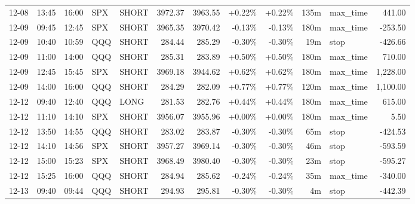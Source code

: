 \documentclass[11pt,a4paper,twoside]{article}
\begin{document}
\begin{center}
\begin{longtable}{>{\color{txtmain}}l l l l l r r r r r >{\color{txtmain}}l r}
12-08 & 13:45 & 16:00 & SPX & SHORT & 3972.37 & 3963.55 & \textcolor{wingreen}{+0.22\%} & \textcolor{wingreen}{+0.22\%} & 135m & max\_time & \textcolor{wingreen}{441.00} \\
12-09 & 09:45 & 12:45 & SPX & SHORT & 3965.35 & 3970.42 & \textcolor{lossred}{-0.13\%} & \textcolor{lossred}{-0.13\%} & 180m & max\_time & \textcolor{lossred}{-253.50} \\
12-09 & 10:40 & 10:59 & QQQ & SHORT & 284.44 & 285.29 & \textcolor{lossred}{-0.30\%} & \textcolor{lossred}{-0.30\%} & 19m & stop & \textcolor{lossred}{-426.66} \\
12-09 & 11:00 & 14:00 & QQQ & SHORT & 285.31 & 283.89 & \textcolor{wingreen}{+0.50\%} & \textcolor{wingreen}{+0.50\%} & 180m & max\_time & \textcolor{wingreen}{710.00} \\
12-09 & 12:45 & 15:45 & SPX & SHORT & 3969.18 & 3944.62 & \textcolor{wingreen}{+0.62\%} & \textcolor{wingreen}{+0.62\%} & 180m & max\_time & \textcolor{wingreen}{1,228.00} \\
12-09 & 14:00 & 16:00 & QQQ & SHORT & 284.29 & 282.09 & \textcolor{wingreen}{+0.77\%} & \textcolor{wingreen}{+0.77\%} & 120m & max\_time & \textcolor{wingreen}{1,100.00} \\
12-12 & 09:40 & 12:40 & QQQ & LONG & 281.53 & 282.76 & \textcolor{wingreen}{+0.44\%} & \textcolor{wingreen}{+0.44\%} & 180m & max\_time & \textcolor{wingreen}{615.00} \\
12-12 & 11:10 & 14:10 & SPX & SHORT & 3956.07 & 3955.96 & \textcolor{wingreen}{+0.00\%} & \textcolor{wingreen}{+0.00\%} & 180m & max\_time & \textcolor{wingreen}{5.50} \\
12-12 & 13:50 & 14:55 & QQQ & SHORT & 283.02 & 283.87 & \textcolor{lossred}{-0.30\%} & \textcolor{lossred}{-0.30\%} & 65m & stop & \textcolor{lossred}{-424.53} \\
12-12 & 14:10 & 14:56 & SPX & SHORT & 3957.27 & 3969.14 & \textcolor{lossred}{-0.30\%} & \textcolor{lossred}{-0.30\%} & 46m & stop & \textcolor{lossred}{-593.59} \\
12-12 & 15:00 & 15:23 & SPX & SHORT & 3968.49 & 3980.40 & \textcolor{lossred}{-0.30\%} & \textcolor{lossred}{-0.30\%} & 23m & stop & \textcolor{lossred}{-595.27} \\
12-12 & 15:25 & 16:00 & QQQ & SHORT & 284.94 & 285.62 & \textcolor{lossred}{-0.24\%} & \textcolor{lossred}{-0.24\%} & 35m & max\_time & \textcolor{lossred}{-340.00} \\
12-13 & 09:40 & 09:44 & QQQ & SHORT & 294.93 & 295.81 & \textcolor{lossred}{-0.30\%} & \textcolor{lossred}{-0.30\%} & 4m & stop & \textcolor{lossred}{-442.39} \\

\end{longtable}
\end{center}
\end{document}
